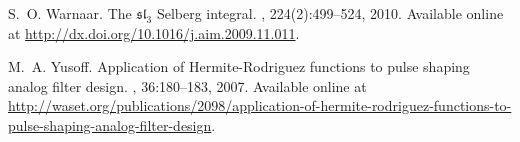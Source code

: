 \begin{thebibliography}{CMS94}
S.~O. Warnaar.
\newblock The {${\mathfrak{sl}}_3$} {S}elberg integral.
, 224(2):499--524, 2010.
\newblock Available online at
  \url{http://dx.doi.org/10.1016/j.aim.2009.11.011}.

M.~A. Yusoff.
\newblock Application of {H}ermite-{R}odriguez functions to pulse shaping
  analog filter design.
, 36:180--183, 2007.
\newblock Available online at
  \url{http://waset.org/publications/2098/application-of-hermite-rodriguez-functions-to-pulse-shaping-analog-filter-design}.

\end{thebibliography}
